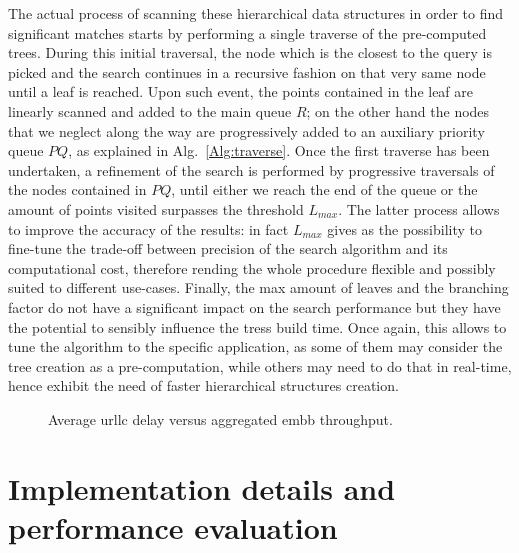 \documentclass[a4paper, 11pt, oneside]{article}
\newlength\fheight
\newlength\fwidth
\begin{document}
The actual process of scanning these hierarchical data structures in order to find significant matches starts by performing a single traverse of the pre-computed trees. During this initial traversal, the node which is the closest to the query is picked and the search continues in a recursive fashion on that very same node until a leaf is reached. Upon such event, the points contained in the leaf are linearly scanned and added to the main queue $R$; on the other hand the nodes that we neglect along the way are progressively added to an auxiliary priority queue $PQ$, as explained in Alg.~\ref{Alg:traverse}. Once the first traverse has been undertaken, a refinement of the search is performed by progressive traversals of the nodes contained in $PQ$, until either we reach the end of the queue or the amount of points visited surpasses the threshold $L_{max}$. The latter process allows to improve the accuracy of the results: in fact $L_{max}$ gives as the possibility to fine-tune the trade-off between precision of the search algorithm and its computational cost, therefore rending the whole procedure flexible and possibly suited to different use-cases. Finally, the max amount of leaves and the branching factor do not have a significant impact on the search performance but they have the potential to sensibly influence the tress build time. Once again, this allows to tune the algorithm to the specific application, as some of them may consider the tree creation as a pre-computation, while others may need to do that in real-time, hence exhibit the need of faster hierarchical structures creation.



    
\begin{figure}[h!]
  \centering
    \setlength{}
    \setlength{}
    
    \setlength\belowcaptionskip{-.3cm}
    \caption{Average \gls{urllc} delay versus aggregated \gls{embb} throughput.}
    \label{Fig:t_d_versus_numEmbbUes}
\end{figure}    

	\section*{Implementation details and performance evaluation}    



\end{document}

